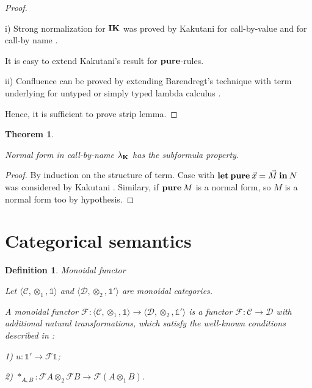 \documentclass[a4paper]{article}
\newtheorem{theorem}{Theorem}
\newtheorem{defin}{Definition}
\begin{document}
\begin{proof}
  $ $

i) Strong normalization for ${\bf IK}$ was proved by Kakutani for call-by-value and for call-by name \cite{ModalK} \cite{ModalK1}.

It is easy to extend Kakutani's result for ${\bf pure}$-rules.

ii) Confluence can be proved by extending Barendregt's technique with term underlying for untyped or simply typed lambda calculus \cite{Baren}.

Hence, it is sufficient to prove strip lemma.
\end{proof}

\begin{theorem}
  $ $

  Normal form in call-by-name $\lambda_{{\bf K}}$ has the subformula property.

\end{theorem}

\begin{proof}
  By induction on the structure of term. Case with ${\bf let \: pure\:} \vec{x} = \vec{M} {\: \bf in \:} N$ was considered by Kakutani \cite{ModalK} \cite{ModalK1}.
  Similary, if ${\bf pure \:} M$ is a normal form, so $M$ is a normal form too by hypothesis.
\end{proof}

\section{Categorical semantics}

\begin{defin} Monoidal functor

  Let $\langle \mathcal{C}, \otimes_1, \mathds{1} \rangle$ and $\langle \mathcal{D}, \otimes_2, \mathds{1}' \rangle$ are monoidal categories.

  A monoidal functor $\mathcal{F} : \langle \mathcal{C}, \otimes_1, \mathds{1} \rangle \to \langle \mathcal{D}, \otimes_2, \mathds{1}' \rangle$ is a functor
  $\mathcal{F} : \mathcal{C} \to \mathcal{D}$ with additional natural transformations, which satisfy the well-known conditions described in \cite{ElKelly}:

  1) $u : \mathds{1}' \to \mathcal{F}\mathds{1}$;

  2) $\ast_{A, B} : \mathcal{F}A \otimes_2 \mathcal{F}B \to \mathcal{F}(A \otimes_1 B)$.

\end{defin}
\end{document}
